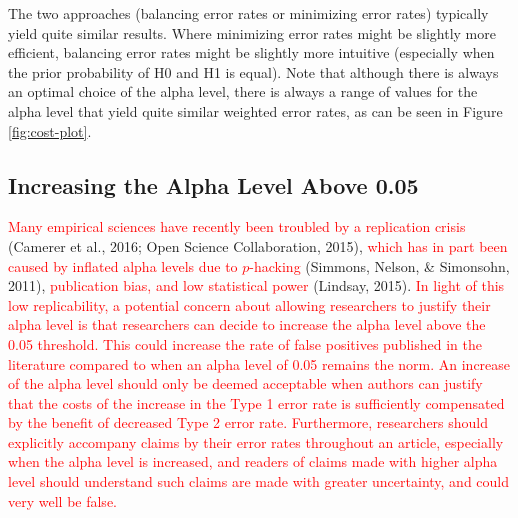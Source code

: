 \documentclass[
  english,
  ,man, a4paper,floatsintext]{apa6}
\begin{document}
The two approaches (balancing error rates or minimizing error rates) typically yield quite similar results. Where minimizing error rates might be slightly more efficient, balancing error rates might be slightly more intuitive (especially when the prior probability of H0 and H1 is equal). Note that although there is always an optimal choice of the alpha level, there is always a range of values for the alpha level that yield quite similar weighted error rates, as can be seen in Figure \ref{fig:cost-plot}.

\hypertarget{increasing-the-alpha-level-above-0.05}{%
\subsection{Increasing the Alpha Level Above 0.05}\label{increasing-the-alpha-level-above-0.05}}

\textcolor{red}{Many empirical sciences have recently been troubled by a replication crisis}
(Camerer et al., 2016; Open Science Collaboration, 2015), \textcolor{red}{which has in part been caused by inflated alpha levels due to $p$-hacking} (Simmons, Nelson, \& Simonsohn, 2011), \textcolor{red}{publication bias, and low statistical power} (Lindsay, 2015). \textcolor{red}{In light of this low replicability, a potential concern about allowing researchers to justify their alpha level is that researchers can decide to increase the alpha level above the 0.05 threshold. This could increase the rate of false positives published in the literature compared to when an alpha level of 0.05 remains the norm. An increase of the alpha level should only be deemed acceptable when authors can justify that the costs of the increase in the Type 1 error rate is sufficiently compensated by the benefit of decreased Type 2 error rate. Furthermore, researchers should explicitly accompany claims by their error rates throughout an article, especially when the alpha level is increased, and readers of claims made with higher alpha level should understand such claims are made with greater uncertainty, and could very well be false.}
\end{document}
